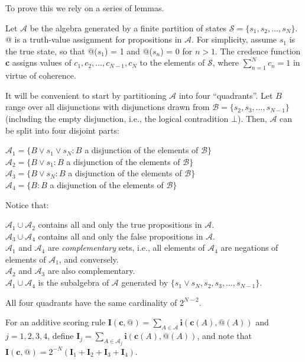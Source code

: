 \documentclass[
  10pt,
  letterpaper,
  DIV=11,
  numbers=noendperiod,
  twoside]{scrartcl}
\begin{document}
To prove this we rely on a series of lemmas.

Let \(\mathscr{A}\) be the algebra generated by a finite partition of
states \(\mathscr{S}= \{s_1, s_2, \dots, s_N\}\). @ is a truth-value
assignment for propositions in \(\mathscr{A}\). For simplicity, assume
\(s_1\) is the true state, so that @(\(s_1\)) = 1 and @(\(s_n\)) = 0 for
\(n > 1\). The credence function \textbf{c} assigns values of
\(c_1, c_2, \dots, c_{N-1}, c_N\) to the elements of \(\mathscr{S}\),
where \(\sum^{N}_{n=1} c_n = 1\) in virtue of coherence.

It will be convenient to start by partitioning \(\mathscr{A}\) into four
``quadrants''. Let \(B\) range over all disjunctions with disjunctions
drawn from \(\mathscr{B}= \{s_2, s_3, \dots, s_{N-1}\}\) (including the
empty disjunction, i.e., the logical contradition \(\bot\)). Then,
\(\mathscr{A}\) can be split into four disjoint parts:

\(\mathscr{A}_1 = \{B \vee s_1 \vee s_N: B\) a disjunction of the
elements of \(\mathscr{B}\}\)\\
\(\mathscr{A}_2 = \{B \vee s_1: B\) a disjunction of the elements of
\(\mathscr{B}\}\)\\
\(\mathscr{A}_3 = \{B \vee s_N: B\) a disjunction of the elements of
\(\mathscr{B}\}\)\\
\(\mathscr{A}_4 = \{B: B\) a disjunction of the elements of
\(\mathscr{B}\}\)

Notice that:

\(\mathscr{A}_1 \cup \mathscr{A}_2\) contains all and only the true
propositions in \(\mathscr{A}\).\\
\(\mathscr{A}_3 \cup \mathscr{A}_4\) contains all and only the false
propositions in \(\mathscr{A}\).\\
\(\mathscr{A}_1\) and \(\mathscr{A}_4\) are \emph{complementary} sets,
i.e., all elements of \(\mathscr{A}_4\) are negations of elements of
\(\mathscr{A}_1\), and conversely.\\
\(\mathscr{A}_2\) and \(\mathscr{A}_3\) are also complementary.\\
\(\mathscr{A}_1 \cup \mathscr{A}_4\) is the subalgebra of
\(\mathscr{A}\) generated by
\(\{s_1 \vee s_N, s_2, s_3, \dots, s_{N-1}\}\).

All four quadrants have the same cardinality of \(2^{N-2}\).

For an additive scoring rule
\(\mathbf{I}(\mathbf{c}, @) = \sum_{A \in \mathscr{A}}\mathbf{i}(\mathbf{c}(A), @(A))\)
and \(j = 1, 2, 3, 4\), define
\(\mathbf{I}_j = \sum_{A \in \mathscr{A}_j}\mathbf{i}(\mathbf{c}(A), @(A))\),
and note that
\(\mathbf{I}(\mathbf{c}, @) = 2^{-N}(\mathbf{I}_1 + \mathbf{I}_2 + \mathbf{I}_3 + \mathbf{I}_4)\).
\end{document}
